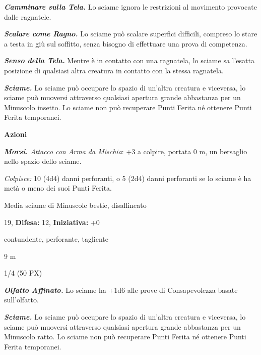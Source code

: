 \begin{multicols}{2}
{\emph{\textbf{Camminare sulla Tela.}} Lo sciame ignora le restrizioni al movimento provocate dalle ragnatele.

\emph{\textbf{Scalare come Ragno.}} Lo sciame può scalare superfici difficili, compreso lo stare a testa in giù sul soffitto, senza bisogno di effettuare una prova di competenza.

\emph{\textbf{Senso della Tela.}} Mentre è in contatto con una ragnatela, lo sciame sa l'esatta posizione di qualsiasi altra creatura in contatto con la stessa ragnatela.

\emph{\textbf{Sciame.}} Lo sciame può occupare lo spazio di un'altra creatura e viceversa, lo sciame può muoversi attraverso qualsiasi apertura grande abbastanza per un Minuscolo insetto. Lo sciame non può recuperare Punti Ferita né ottenere Punti Ferita temporanei.

\textbf{Azioni}

\emph{\textbf{Morsi.} Attacco con Arma da Mischia}: +3 a colpire, portata 0 m, un bersaglio nello spazio dello sciame.

\emph{Colpisce:} 10 (4d4) danni perforanti, o 5 (2d4) danni perforanti se lo sciame è ha metà o meno dei suoi Punti Ferita.

\begin{description}[noitemsep, topsep=0pt, parsep=0pt, partopsep=0pt, leftmargin=0cm, labelwidth=2.2cm]
    \item[\textbf{Taglia/Tipo:}] Media sciame di Minuscole bestie, disallineato
    \item[\textbf{Caratt.:}] 
    \item[\textbf{Punti Ferita:}] 19,  \textbf{Difesa:} 12,  \textbf{Iniziativa:} +0
    \item[\textbf{Resistenze al danno:}] contundente, perforante, tagliente
    \item[\textbf{Tiri Salvez.:}] 
    \item[\textbf{Movimento:}] 9 m
    \item[\textbf{Sfida:}] 1/4 (50 PX)\smallskip
\end{description}

\emph{\textbf{Olfatto Affinato.}} Lo sciame ha +1d6 alle prove di Consapevolezza basate sull'olfatto.

\emph{\textbf{Sciame.}} Lo sciame può occupare lo spazio di un'altra creatura e viceversa, lo sciame può muoversi attraverso qualsiasi apertura grande abbastanza per un Minuscolo ratto. Lo sciame non può recuperare Punti Ferita né ottenere Punti Ferita temporanei.

}
\end{multicols}
